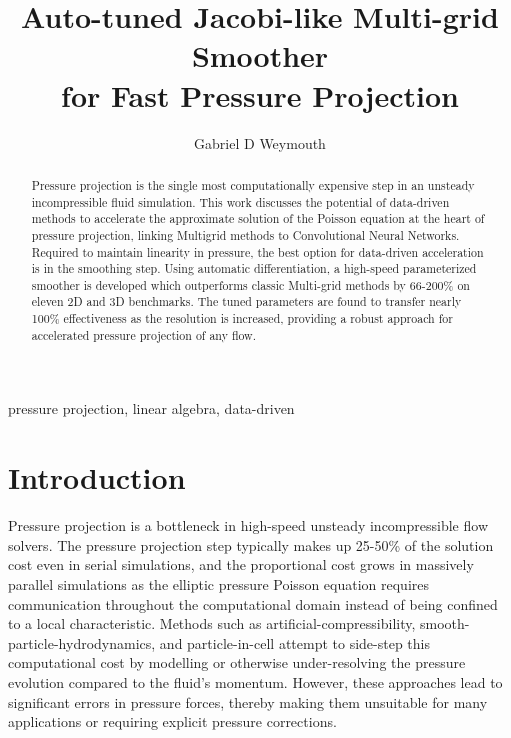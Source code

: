 \documentclass[review]{elsarticle}
\begin{document}
\begin{frontmatter}

\title{Auto-tuned Jacobi-like Multi-grid Smoother\\ for Fast Pressure Projection}

\author{Gabriel D Weymouth}
\address{Engineering and Physical Sciences, University of Southampton, Southampton, UK}
\address{Data-Centric Engineering, Alan Turing Institute, London, UK}

\begin{abstract}
Pressure projection is the single most computationally expensive step in an unsteady incompressible fluid simulation. This work discusses the potential of data-driven methods to accelerate the approximate solution of the Poisson equation at the heart of pressure projection, linking Multigrid methods to Convolutional Neural Networks. Required to maintain linearity in pressure, the best option for data-driven acceleration is in the smoothing step. Using automatic differentiation, a high-speed parameterized smoother is developed which outperforms classic Multi-grid methods by 66-200\% on eleven 2D and 3D benchmarks. The tuned parameters are found to transfer nearly 100\% effectiveness as the resolution is increased, providing a robust approach for accelerated pressure projection of any flow.
\end{abstract}

\begin{keyword}
pressure projection, linear algebra, data-driven
\end{keyword}

\end{frontmatter}

\section{Introduction}

Pressure projection is a bottleneck in high-speed unsteady incompressible flow solvers. The pressure projection step typically makes up 25-50\% of the solution cost even in serial simulations, and the proportional cost grows in massively parallel simulations as the elliptic pressure Poisson equation requires communication throughout the computational domain instead of being confined to a local characteristic. Methods such as artificial-compressibility, smooth-particle-hydrodynamics, and particle-in-cell attempt to side-step this computational cost by modelling or otherwise under-resolving the pressure evolution compared to the fluid's momentum. However, these approaches lead to significant errors in pressure forces, thereby making them unsuitable for many applications or requiring explicit pressure corrections.
\end{document}
